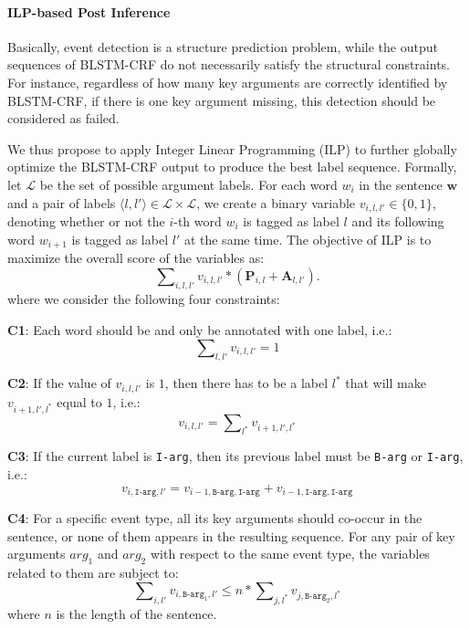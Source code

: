 \paragraph{ILP-based Post Inference}
Basically, event detection is a structure prediction problem, while the output sequences of BLSTM-CRF do not necessarily satisfy the structural constraints. For instance, regardless of how many key arguments are correctly identified by BLSTM-CRF, if there is one key argument missing, this detection should be considered as failed. 

We thus propose to apply Integer Linear Programming (ILP) to further globally optimize the BLSTM-CRF output  to produce the best label sequence.
Formally, let $\mathcal{L}$ be the set of possible argument labels. For each word $w_i$ in the sentence $\bm{w}$ and a pair of labels $ \langle l, l' \rangle \in \mathcal{L} \times \mathcal{L}$, we create a binary variable ${v_{i,l,l'} \in \{0, 1\}}$, denoting whether or not the $i$-th word $w_i$ is tagged as label $l$ and its following word $w_{i+1}$ is tagged as label $l'$ at the same time. The objective of ILP is to maximize the overall score of the variables as:
\begin{displaymath}
	\sum\nolimits_{i, l, l'}v_{i,l,l'} * (\textbf{P}_{i,l}+\textbf{A}_{l,l'}) .
\end{displaymath}
where we consider the following four constraints:

\textbf{C1}: Each word should be and only be annotated with one label, i.e.:
\begin{equation}
	\sum\nolimits_{l,l'}v_{i,l,l'}=1
\end{equation}

\textbf{C2}: If the value of $v_{i,l,l'}$ is $1$, then there has to be a label $l^*$ that will make $v_{i+1,l',l^*}$ equal to $1$, i.e.:
\begin{equation}
	v_{i,l,l'} = \sum\nolimits_{l^*}v_{i+1,l',l^*}
\end{equation}

\textbf{C3}: If the current label is \texttt{I-arg}, then its previous label must be \texttt{B-arg} or \texttt{I-arg}, i.e.:
\begin{equation}
	v_{i,\texttt{I-arg},l'} = v_{i-1,\texttt{B-arg},\texttt{I-arg}} + v_{i-1, \texttt{I-arg}, \texttt{I-arg}}
\end{equation}

\textbf{C4}: For a specific event type, all its key arguments should co-occur in the sentence, or none of them appears in the resulting sequence. For any pair of key arguments $arg_1$ and $arg_2$ with respect to the same event type, the variables related to them are subject to:
\begin{equation}
	\sum\nolimits_{i,l'}{v_{i,\texttt{B-arg}_1,l'}} \leq n * \sum\nolimits_{j,l^*}{v_{j,\texttt{B-arg}_2,l^*}}
\end{equation}
where $n$ is the length of the sentence.

